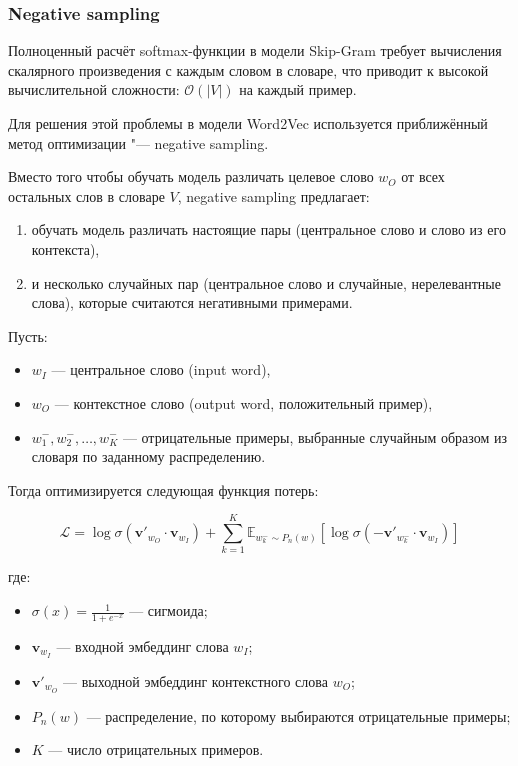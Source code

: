 \documentclass[coursework]{SCWorks}
\begin{document}
\subsubsection{Negative sampling}
Полноценный расчёт softmax-функции в модели Skip-Gram требует вычисления скалярного произведения с каждым словом в словаре, что приводит к высокой вычислительной сложности: $\mathcal{O}(|V|)$ на каждый пример.

Для решения этой проблемы в модели Word2Vec используется приближённый метод оптимизации "--- negative sampling.

Вместо того чтобы обучать модель различать целевое слово $w_O$ от всех остальных слов в словаре $V$, negative sampling предлагает:
\begin{enumerate}
  \item обучать модель различать настоящие пары (центральное слово и слово из его контекста),
  \item и несколько случайных пар (центральное слово и случайные, нерелевантные слова), которые считаются негативными примерами.
\end{enumerate}

Пусть:
\begin{itemize}
  \item $w_I$ — центральное слово (input word),
  \item $w_O$ — контекстное слово (output word, положительный пример),
  \item $w_1^-, w_2^-, \dots, w_K^-$ — отрицательные примеры, выбранные случайным образом из словаря по заданному распределению.
\end{itemize}

Тогда оптимизируется следующая функция потерь:

\[
\mathcal{L} = \log \sigma(\mathbf{v}'_{w_O} \cdot \mathbf{v}_{w_I}) + \sum_{k=1}^{K} \mathbb{E}_{w_k^- \sim P_n(w)} \left[ \log \sigma(-\mathbf{v}'_{w_k^-} \cdot \mathbf{v}_{w_I}) \right]
\]

где:
\begin{itemize}
  \item $\sigma(x) = \frac{1}{1 + e^{-x}}$ — сигмоида;
  \item $\mathbf{v}_{w_I}$ — входной эмбеддинг слова $w_I$;
  \item $\mathbf{v}'_{w_O}$ — выходной эмбеддинг контекстного слова $w_O$;
  \item $P_n(w)$ — распределение, по которому выбираются отрицательные примеры;
  \item $K$ — число отрицательных примеров.
\end{itemize}
\end{document}
